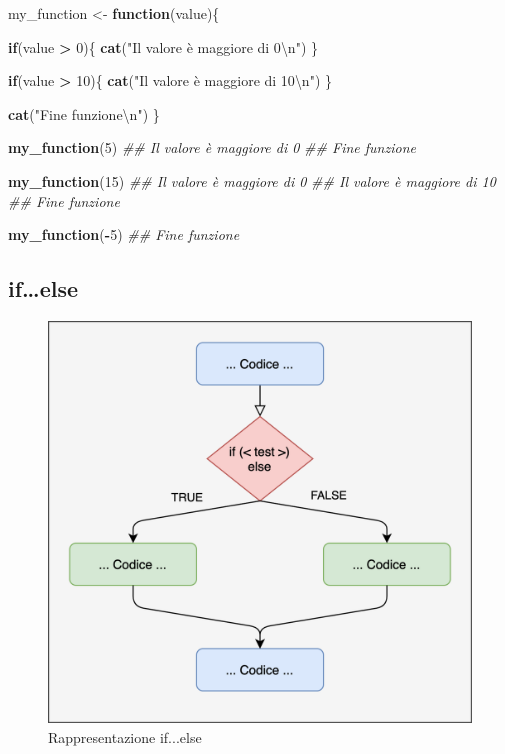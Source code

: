\documentclass[
]{book}
\newenvironment{Shaded}{\begin{snugshade}}{\end{snugshade}}
\newcommand{\CharTok}[1]{\textcolor[rgb]{0.31,0.60,0.02}{#1}}
\newcommand{\CommentTok}[1]{\textcolor[rgb]{0.56,0.35,0.01}{\textit{#1}}}
\newcommand{\ControlFlowTok}[1]{\textcolor[rgb]{0.13,0.29,0.53}{\textbf{#1}}}
\newcommand{\DecValTok}[1]{\textcolor[rgb]{0.00,0.00,0.81}{#1}}
\newcommand{\KeywordTok}[1]{\textcolor[rgb]{0.13,0.29,0.53}{\textbf{#1}}}
\newcommand{\NormalTok}[1]{#1}
\newcommand{\OperatorTok}[1]{\textcolor[rgb]{0.81,0.36,0.00}{\textbf{#1}}}
\newcommand{\StringTok}[1]{\textcolor[rgb]{0.31,0.60,0.02}{#1}}
\begin{document}
\begin{Shaded}
\begin{Highlighting}[]
\NormalTok{my_function <-}\StringTok{ }\ControlFlowTok{function}\NormalTok{(value)\{}
  
  \ControlFlowTok{if}\NormalTok{(value }\OperatorTok{>}\StringTok{ }\DecValTok{0}\NormalTok{)\{}
    \KeywordTok{cat}\NormalTok{(}\StringTok{"Il valore è maggiore di 0}\CharTok{\textbackslash{}n}\StringTok{"}\NormalTok{)}
\NormalTok{  \}}
  
  \ControlFlowTok{if}\NormalTok{(value }\OperatorTok{>}\StringTok{ }\DecValTok{10}\NormalTok{)\{}
    \KeywordTok{cat}\NormalTok{(}\StringTok{"Il valore è maggiore di 10}\CharTok{\textbackslash{}n}\StringTok{"}\NormalTok{)}
\NormalTok{  \}}
  
  \KeywordTok{cat}\NormalTok{(}\StringTok{"Fine funzione}\CharTok{\textbackslash{}n}\StringTok{"}\NormalTok{)}
\NormalTok{\}}

\KeywordTok{my_function}\NormalTok{(}\DecValTok{5}\NormalTok{)}
\CommentTok{## Il valore è maggiore di 0}
\CommentTok{## Fine funzione}

\KeywordTok{my_function}\NormalTok{(}\DecValTok{15}\NormalTok{)}
\CommentTok{## Il valore è maggiore di 0}
\CommentTok{## Il valore è maggiore di 10}
\CommentTok{## Fine funzione}

\KeywordTok{my_function}\NormalTok{(}\OperatorTok{-}\DecValTok{5}\NormalTok{)}
\CommentTok{## Fine funzione}
\end{Highlighting}
\end{Shaded}

\hypertarget{ifelse}{%
\subsection{if\ldots else}\label{ifelse}}

\begin{figure}

{\centering \includegraphics[width=0.65\linewidth]{images/ifelse_chart} 

}

\caption{Rappresentazione if...else}\label{fig:plot-ifelse-chart}
\end{figure}
\end{document}

